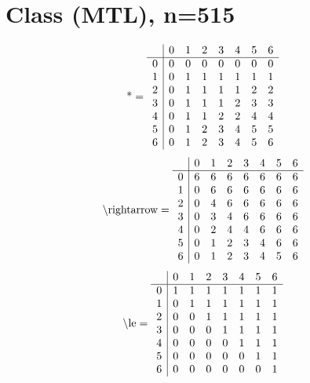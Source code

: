 \documentclass[11pt]{article}
\begin{document}
\section{Class (MTL), n=515}
\[\text{*} = 
\begin{array}{r | r r r r r r r}
 & 0 & 1 & 2 & 3 & 4 & 5 & 6 \\ \hline
0 & 0 & 0 & 0 & 0 & 0 & 0 & 0 \\
1 & 0 & 1 & 1 & 1 & 1 & 1 & 1 \\
2 & 0 & 1 & 1 & 1 & 1 & 2 & 2 \\
3 & 0 & 1 & 1 & 1 & 2 & 3 & 3 \\
4 & 0 & 1 & 1 & 2 & 2 & 4 & 4 \\
5 & 0 & 1 & 2 & 3 & 4 & 5 & 5 \\
6 & 0 & 1 & 2 & 3 & 4 & 5 & 6 \\
\end{array}
\]
\[\text{\textbackslash rightarrow} = 
\begin{array}{r | r r r r r r r}
 & 0 & 1 & 2 & 3 & 4 & 5 & 6 \\ \hline
0 & 6 & 6 & 6 & 6 & 6 & 6 & 6 \\
1 & 0 & 6 & 6 & 6 & 6 & 6 & 6 \\
2 & 0 & 4 & 6 & 6 & 6 & 6 & 6 \\
3 & 0 & 3 & 4 & 6 & 6 & 6 & 6 \\
4 & 0 & 2 & 4 & 4 & 6 & 6 & 6 \\
5 & 0 & 1 & 2 & 3 & 4 & 6 & 6 \\
6 & 0 & 1 & 2 & 3 & 4 & 5 & 6 \\
\end{array}
\]
\[\text{\textbackslash le} = 
\begin{array}{r | r r r r r r r}
 & 0 & 1 & 2 & 3 & 4 & 5 & 6 \\ \hline
0 & 1 & 1 & 1 & 1 & 1 & 1 & 1 \\
1 & 0 & 1 & 1 & 1 & 1 & 1 & 1 \\
2 & 0 & 0 & 1 & 1 & 1 & 1 & 1 \\
3 & 0 & 0 & 0 & 1 & 1 & 1 & 1 \\
4 & 0 & 0 & 0 & 0 & 1 & 1 & 1 \\
5 & 0 & 0 & 0 & 0 & 0 & 1 & 1 \\
6 & 0 & 0 & 0 & 0 & 0 & 0 & 1 \\
\end{array}
\]
\end{document}
